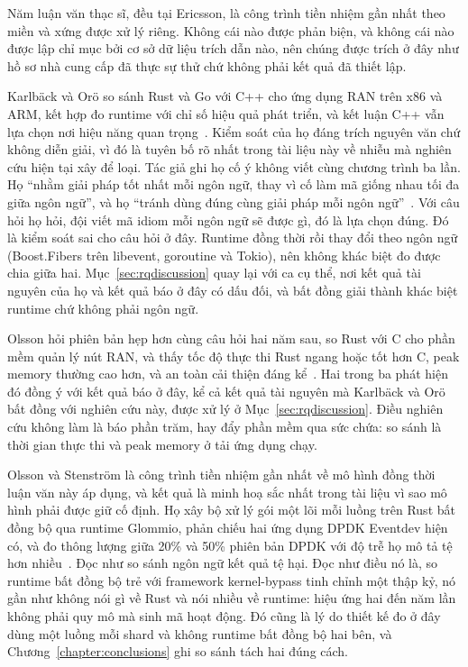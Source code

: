 Năm luận văn thạc sĩ, đều tại Ericsson, là công trình tiền nhiệm gần nhất theo miền và
xứng được xử lý riêng. Không cái nào được phản biện, và không cái nào được lập chỉ mục bởi cơ sở dữ liệu trích dẫn
nào, nên chúng được trích ở đây như hồ sơ nhà cung cấp đã thực sự thử chứ không
phải kết quả đã thiết lập.

Karlb\"ack và Or\"o so sánh Rust và Go với C++ cho ứng dụng RAN trên x86 và ARM,
kết hợp đo runtime với chỉ số hiệu quả phát triển, và kết luận C++ vẫn
lựa chọn nơi hiệu năng quan trọng~\cite{karlback2021ran}. Kiểm soát của họ đáng
trích nguyên văn chứ không diễn giải, vì đó là tuyên bố rõ nhất trong tài liệu này về
nhiễu mà nghiên cứu hiện tại xây để loại. Tác giả ghi họ cố ý không
viết cùng chương trình ba lần. Họ ``nhằm giải pháp tốt nhất mỗi ngôn ngữ,
thay vì cố làm mã giống nhau tối đa giữa ngôn ngữ'', và họ
``tránh dùng đúng cùng giải pháp mỗi
ngôn ngữ''~\cite{karlback2021ran}. Với câu hỏi họ hỏi, đội viết mã idiom mỗi ngôn ngữ sẽ được gì, đó là lựa chọn
đúng. Đó là kiểm soát sai
cho câu hỏi ở đây. Runtime đồng thời rồi thay đổi theo ngôn ngữ
(Boost.Fibers trên libevent, goroutine và Tokio), nên không khác biệt đo được
chia giữa hai. Mục~\ref{sec:rqdiscussion} quay lại với ca cụ thể,
nơi kết quả tài nguyên của họ và kết quả báo ở đây có dấu đối, và
bất đồng giải thành khác biệt runtime chứ không phải ngôn ngữ.

Olsson hỏi phiên bản hẹp hơn cùng câu hỏi hai năm sau, so Rust với C cho
phần mềm quản lý nút RAN, và thấy tốc độ thực thi Rust ngang hoặc tốt hơn C,
peak memory thường cao hơn, và an toàn cải thiện đáng
kể~\cite{olsson2023ranmgmt}. Hai trong ba phát hiện đó đồng ý với kết quả báo ở đây,
kể cả kết quả tài nguyên mà Karlb\"ack và Or\"o bất đồng với nghiên cứu này, được
xử lý ở Mục~\ref{sec:rqdiscussion}. Điều nghiên cứu không làm là báo phần trăm, hay
đẩy phần mềm qua sức chứa: so sánh là thời gian thực thi và peak memory ở
tải ứng dụng chạy.

Olsson và Stenstr\"om là công trình tiền nhiệm gần nhất về mô hình đồng thời luận văn này áp dụng,
và kết quả là minh hoạ sắc nhất trong tài liệu vì sao mô hình phải được giữ
cố định. Họ xây bộ xử lý gói một lõi mỗi luồng trên Rust bất đồng bộ qua runtime Glommio,
phản chiếu hai ứng dụng DPDK Eventdev hiện có, và đo thông lượng giữa
20\% và 50\% phiên bản DPDK với độ trễ họ mô tả tệ
hơn nhiều~\cite{olsson2023asyncpackets}. Đọc như so sánh ngôn ngữ kết quả tệ hại. Đọc như
điều nó là, so runtime bất đồng bộ trẻ với framework kernel-bypass tinh chỉnh
một thập kỷ, nó gần như không nói gì về Rust và nói nhiều về runtime: hiệu ứng
hai đến năm lần không phải quy mô mà sinh mã hoạt động. Đó cũng là
lý do thiết kế đo ở đây dùng một luồng mỗi shard và không runtime bất đồng bộ hai bên, và Chương~\ref{chapter:conclusions} ghi so sánh tách hai
đúng cách.

